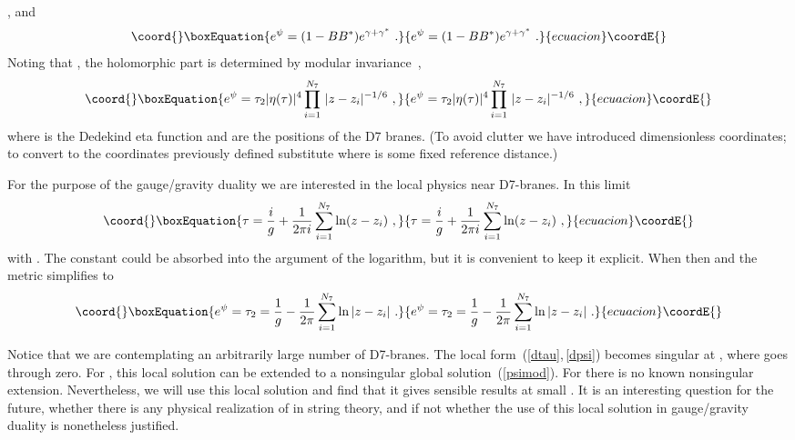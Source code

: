 \documentclass[a4paper,12pt]{article}
\renewcommand{\=}[1]{\bar{#1}}
\begin{document}
\coordHE{}, and
\begin{equation}\coord{}\boxEquation{
e^{\psi}= (1-BB^*)e^{\gamma + \gamma^*} \ .
\label{psi}
}{
e^{\psi}= (1-BB^*)e^{\gamma + \gamma^*} \ .
}{ecuacion}\coordE{}\end{equation}
Noting that
\coordHE{}, the holomorphic part is determined by modular
invariance~\cite{stringycstrings},
\begin{equation}\coord{}\boxEquation{
e^{\psi}= \tau_2 |\eta(\tau)|^4
\prod_{i=1}^{N_7} \, | {z-z_i} |^{-1/6}\ ,
\label{psimod}
}{
e^{\psi}= \tau_2 |\eta(\tau)|^4
\prod_{i=1}^{N_7} \, | {z-z_i} |^{-1/6}\ ,
}{ecuacion}\coordE{}\end{equation}
where \myHighlight{$\eta$}\coordHE{} is the Dedekind eta function and \coordHE{} are the positions
of the D7 branes.  (To avoid clutter we have introduced dimensionless
coordinates; to convert to the coordinates previously defined substitute \coordHE{} where
\coordHE{} is some fixed reference distance.)

For the purpose of the gauge/gravity duality we are interested in the local
physics
near \coordHE{} D7-branes.  In this limit
\begin{equation}\coord{}\boxEquation{
\tau = \frac{i}{g} + \frac{1}{2\pi i} \sum_{i=1}^{N_7} \ln(z-z_i)
\label{dtau} \
,
}{
\tau = \frac{i}{g} + \frac{1}{2\pi i} \sum_{i=1}^{N_7} \ln(z-z_i)
\
,
}{ecuacion}\coordE{}\end{equation}
with \coordHE{}.  The constant could be absorbed into the argument of the
logarithm, but it is convenient to keep it explicit.
When \myHighlight{$z, z_i \ll 1$}\coordHE{} then \myHighlight{$\tau_2 \gg 1$}\coordHE{} and the metric simplifies to
\begin{equation}\coord{}\boxEquation{
e^{\psi} = \tau_2 = \frac{1}{g} - \frac{1}{2\pi} \sum_{i=1}^{N_7} \ln|z-z_i| \
.
\label{dpsi}
}{
e^{\psi} = \tau_2 = \frac{1}{g} - \frac{1}{2\pi} \sum_{i=1}^{N_7} \ln|z-z_i| \
.
}{ecuacion}\coordE{}\end{equation}

Notice that we are contemplating an arbitrarily large number of D7-branes.  The
local form~(\ref{dtau},\,\ref{dpsi}) becomes singular at \coordHE{}, where
\myHighlight{$\tau_2$}\coordHE{}
goes through zero.  For \coordHE{}, this  local solution can be
extended to a nonsingular global solution~(\ref{psimod}).  For \coordHE{} there
is no known nonsingular extension.  Nevertheless, we will use this local
solution and find that it gives sensible results at small \coordHE{}.  It is an
interesting question for the future, whether there is any physical realization
of \myHighlight{$N_7 > 24$}\coordHE{} in string theory, and if not whether the use of this local
solution
in gauge/gravity duality is nonetheless justified.
\end{document}
